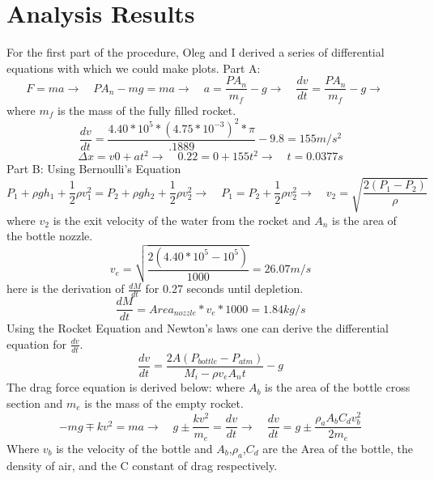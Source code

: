 \documentclass[a4paper,11pt]{article}
\begin{document}
\section{Analysis Results}
{}
{\quad For the first part of the procedure, Oleg and I derived a series of differential equations with which we could make plots.}
{Part A: }
\begin{equation} 
    F = ma  \rightarrow \quad PA_{n} - mg = ma \rightarrow \quad a = \frac{PA_{n}}{m_{f}}-g \rightarrow \quad \frac{dv}{dt} = \frac{PA_{n}}{m_{f}}-g \rightarrow \quad 
\end{equation}
{where $m_{f}$ is the mass of the fully filled rocket.}
\begin{equation}   
    \frac{dv}{dt} = \frac{4.40*10^5*(4.75*10^{-3})^{2}*\pi}{.1889}-9.8 = 155 m/s^2
\end{equation}
\begin{equation}   
    \Delta x = v0 + at^2 \rightarrow \quad 0.22 = 0 + 155t^2 \rightarrow \quad t = 0.0377s
\end{equation}
{Part B: Using Bernoulli's Equation}
\begin{equation} 
    P_{1} + \rho gh_{1} + \frac{1}{2}\rho v_{1}^2 = P_{2} + \rho gh_{2} + \frac{1}{2}\rho v_{2}^2\rightarrow\quad  P_{1} = P_{2} + \frac{1}{2}\rho v_{2}^2\rightarrow \quad v_{2} = \sqrt{\frac{2(P_{1} - P_{2})}{\rho}}  
\end{equation}
{where $v_{2}$ is the exit velocity of the water from the rocket and $A_{n}$ is the area of the bottle nozzle.}
\begin{equation}
    v_{e} = \sqrt{\frac{2(4.40*10^5- 10^5)}{1000}} = 26.07m/s
\end{equation}
{here is the derivation of $\frac{dM}{dt}$ for 0.27 seconds until depletion.}
\begin{equation}
    \frac{dM}{dt} = Area_{nozzle} * v_{e} * 1000 = 1.84 kg/s  
\end{equation}
{Using the Rocket Equation and Newton's laws one can derive the differential equation for $\frac{dv}{dt}$.}
\begin{equation}
    \frac{dv}{dt} = \frac{2A(P_{bottle} - P_{atm})}{M_{i} - \rho v_{e} A_{n} t} - g
\end{equation}
{The drag force equation is derived below: where $A_{b}$ is the area of the bottle cross section and $m_{e}$ is the mass of the empty rocket.}
\begin{equation}
   -mg \mp kv^{2} = ma \rightarrow \quad g \pm \frac{kv^2}{m_{e}} = \frac{dv}{dt} \rightarrow \quad 
    \frac{dv}{dt} = g \pm \frac{\rho_{a} A_{b}C_{d}v_{b}^2}{2m_{e}}
\end{equation}
{Where $v_{b}$ is the velocity of the bottle and $A_{b}$,$\rho_{a}$,$C_{d}$ are the Area of the bottle, the density of air, and the C constant of drag respectively.}
\begin{figure}[H]
\end{figure}
\end{document}
